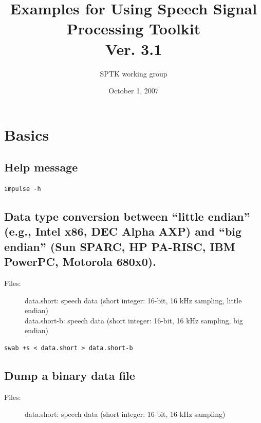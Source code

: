 \documentclass[a4paper,10pt]{article}
\title{
  Examples for Using Speech Signal Processing Toolkit\\
  Ver. 3.1}
\author{SPTK working group}
\date{October 1, 2007}
\begin{document}
\maketitle


\tableofcontents

\section{Basics}

\subsection{Help message}

\begin{verbatim}
impulse -h
\end{verbatim}

\subsection{Data type conversion between ``little endian'' (e.g., Intel x86,
DEC Alpha AXP) and ``big endian'' (Sun SPARC, HP PA-RISC, IBM PowerPC, Motorola
680x0).}

\begin{description}
\item[Files:]
  data.short: speech data (short integer: 16-bit, 16 kHz sampling, little endian)\\
  data.short-b: speech data (short integer: 16-bit, 16 kHz sampling, big endian)
\end{description}

\begin{verbatim}
swab +s < data.short > data.short-b
\end{verbatim}

\subsection{Dump a binary data file}

\begin{description}
\item[Files:]
  data.short: speech data (short integer: 16-bit, 16 kHz sampling)
\end{description}
\end{document}
